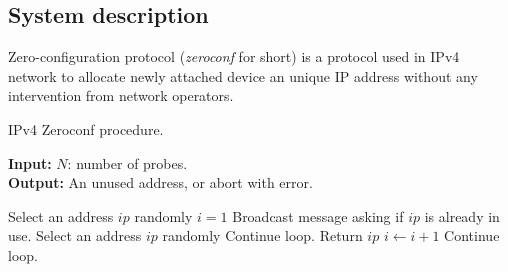 \subsection{System description}
Zero-configuration protocol (\textit{zeroconf} for short) \cite{ZeroConf} is a protocol used in IPv4 network to
allocate newly attached device an unique IP address without any intervention from network operators.
\begin{algorithm}[H]
    \caption{IPv4 Zeroconf procedure.}
    \label{alg:gen-sir-ctmc}
    \footnotesize{
        \hspace*{\algorithmicindent} \textbf{Input:} $N$: number of probes.\\
        \hspace*{\algorithmicindent} \textbf{Output:} An unused address, or abort with error.
    }
    \begin{algorithmic}[1]
        \State Select an address $ip$ randomly
        \State $i = 1$
        \State Broadcast message asking if $ip$ is already in use.
        \State Select an address $ip$ randomly
        \State Continue loop.
        \EndIf
        \State Return $ip$
        \EndIf
        \State $i \leftarrow i + 1$
        \State Continue loop.
        \EndIf
        \EndWhile
        \EndProcedure
    \end{algorithmic}
\end{algorithm}


